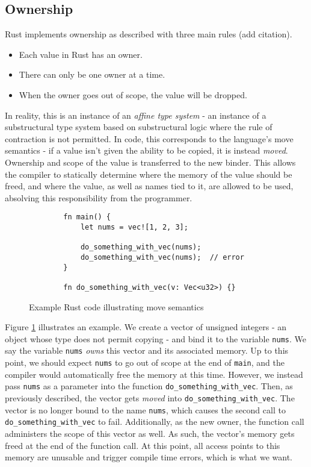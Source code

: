 \documentclass[letterpaper,11pt]{article}
\begin{document}
\subsection{Ownership}
Rust implements ownership as described with three main rules (add citation).
\begin{itemize}
    \item Each value in Rust has an owner.
    \item There can only be one owner at a time.
    \item When the owner goes out of scope, the value will be dropped.
\end{itemize}
In reality, this is an instance of an \textit{affine type system} - an instance
of a substructural type system based on substructural logic where the rule
of contraction is not permitted. In code, this corresponds to the language's
move semantics - if a value isn't given the ability to be copied, it is instead
\textit{moved}. Ownership and scope of the value is transferred to the new binder.
This allows the compiler to statically determine where the memory of the value
should be freed, and where the value, as well as names tied to it, are allowed to
be used, absolving this responsibility from the programmer.
\begin{figure}[h]
    \begin{lstlisting}
        fn main() {
            let nums = vec![1, 2, 3];

            do_something_with_vec(nums);
            do_something_with_vec(nums);  // error
        }

        fn do_something_with_vec(v: Vec<u32>) {}
    \end{lstlisting}

    \caption{Example Rust code illustrating move semantics}
    \label{ms}
\end{figure}
Figure \ref{ms} illustrates an example. We create a vector of unsigned
integers - an object whose type does not permit copying - and bind it to the
variable \texttt{nums}. We say the variable \texttt{nums} \textit{owns} this
vector and its associated memory. Up to this point, we should expect \texttt{nums}
to go out of scope at the end of \texttt{main}, and the compiler would automatically
free the memory at this time. However, we instead pass \texttt{nums} as a parameter
into the function \texttt{do\_something\_with\_vec}. Then, as previously described,
the vector gets \textit{moved} into \texttt{do\_something\_with\_vec}. The vector is
no longer bound to the name \texttt{nums}, which causes the second call to
\texttt{do\_something\_with\_vec} to fail. Additionally, as the new owner, the
function call administers the scope of this vector as well. As such, the vector's
memory gets freed at the end of the function call. At this point, all access points to this memory are unusable and trigger compile time errors, which is what we want.
\end{document}
